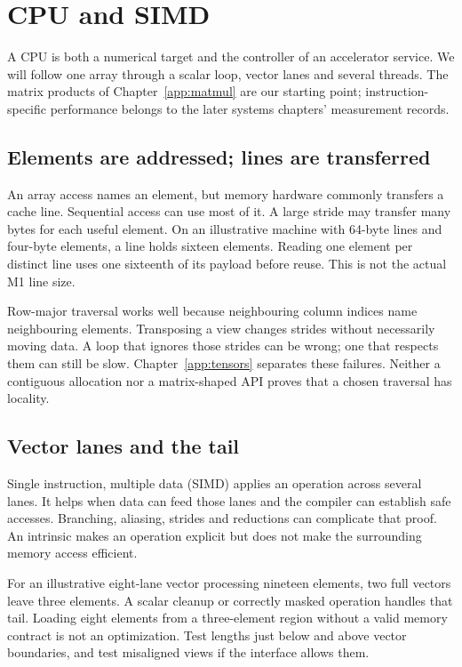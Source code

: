 \chapter{CPU and SIMD}\label{app:cpu}
\begin{ChapterIntent}
A CPU is both a numerical target and the controller of an accelerator
service. We will follow one array through a scalar loop, vector lanes and
several threads. The matrix products of Chapter~\ref{app:matmul} are our
starting point; instruction-specific performance belongs to the later
systems chapters' measurement records.
\end{ChapterIntent}

\section{Elements are addressed; lines are transferred}
An array access names an element, but memory hardware commonly transfers
a cache line. Sequential access can use most of it. A large stride may
transfer many bytes for each useful element. On an illustrative machine
with 64-byte lines and four-byte elements, a line holds sixteen elements.
Reading one element per distinct line uses one sixteenth of its payload
before reuse. This is not the actual M1 line size.

Row-major traversal works well because neighbouring column indices name
neighbouring elements. Transposing a view changes strides without
necessarily moving data. A loop that ignores those strides can be wrong;
one that respects them can still be slow. Chapter~\ref{app:tensors} separates these
failures. Neither a contiguous allocation nor a matrix-shaped API proves
that a chosen traversal has locality.

\section{Vector lanes and the tail}
Single instruction, multiple data (SIMD) applies an operation across
several lanes. It helps when data can feed those lanes and the compiler
can establish safe accesses. Branching, aliasing, strides and reductions
can complicate that proof. An intrinsic makes an operation explicit but
does not make the surrounding memory access efficient.

For an illustrative eight-lane vector processing nineteen elements, two
full vectors leave three elements. A scalar cleanup or correctly masked
operation handles that tail. Loading eight elements from a three-element
region without a valid memory contract is not an optimization. Test
lengths just below and above vector boundaries, and test misaligned views
if the interface allows them.

